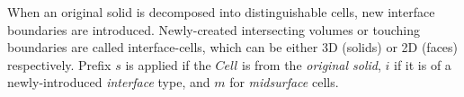 %	 	
%
%
When an original solid is decomposed into distinguishable cells, new interface boundaries are introduced. Newly-created intersecting volumes or touching boundaries are called interface-cells, which can be either 3D (solids) or 2D (faces) respectively. Prefix $s$ is applied if the $Cell$ is from the {\em original solid}, $i$ if it is of a newly-introduced  {\em interface} type, and $m$ for {\em midsurface} cells.

